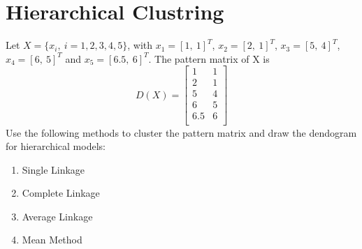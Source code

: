 \documentclass[12pt]{article}
\numberwithin{equation}{section}
\numberwithin{table}{section}
\numberwithin{figure}{section}
\begin{document}
\section{Hierarchical Clustring}
Let $X = \{x_i,\ i = 1, 2, 3, 4, 5 \}$, with $x_1 = [1,\ 1]^T$, $x_2 = [2,\ 1]^T$, $x_3 = [5,\ 4]^T$, $x_4 = [6,\ 5]^T$ and $x_5 = [6.5,\ 6]^T$. The pattern matrix of X is
$$
	D(X) = \begin{bmatrix}
	1 & 1\\
	2 & 1\\
	5 & 4\\
	6 & 5\\
	6.5 & 6\\
	\end{bmatrix}
$$
Use the following methods to cluster the pattern matrix and draw the dendogram for hierarchical models:
\begin{enumerate}[label=(\alph*)]
	\item Single Linkage
	\item Complete Linkage
	\item Average Linkage
	\item Mean Method
\end{enumerate}
\end{document}

